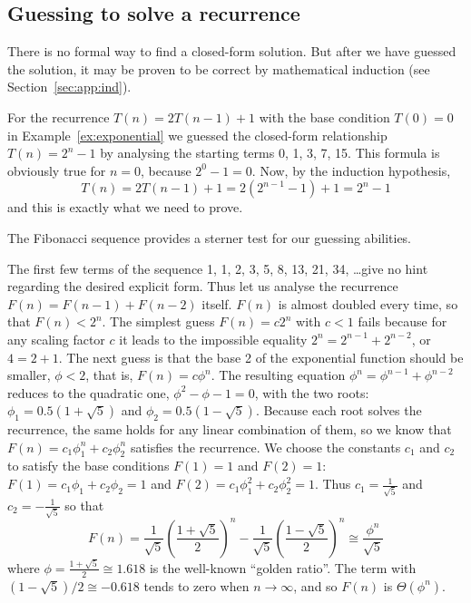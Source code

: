 \subsection{Guessing to solve a recurrence}

There is no formal way to find a closed-form solution. But after we 
have guessed the solution, it may be proven to be correct by 
mathematical induction (see Section~\ref{sec:app:ind}).

\begin{Example}\label{ex:exp:recurrence}
For the recurrence \(T(n) = 2T(n-1)+1\) with
the base condition \(T(0) = 0\) in Example~\ref{ex:exponential}
we guessed
the closed-form relationship \(T(n) = 2^{n} - 1\) by
analysing the starting terms 0, 1, 3, 7, 15. This formula
is obviously true for \(n=0\), because \(2^0 - 1 = 0\).
Now, by the induction hypothesis, 
\[
T(n) = 2T(n-1)+1 = 2  (2^{n-1}-1) + 1 = 2^{n} - 1
\]
and this is exactly what we need to prove.
\end{Example}

The Fibonacci sequence provides a sterner test for our guessing abilities.
\begin{Example}
\label{ex:fibonacci:formula}
The first few terms of the sequence 
1, 1, 2, 3, 5, 8, 13, 21, 34, \ldots give
no hint regarding the desired explicit form. Thus let us
analyse the recurrence 
\(F(n)=F(n-1)+F(n-2)\) itself. \(F(n)\) is almost
doubled every time, so that \(F(n) < 2^n\). The simplest
guess \(F(n) = c2^n\) with \(c < 1\) 
fails because for any scaling factor 
\(c\) it leads to the impossible equality \(2^n = 2^{n-1}+2^{n-2}\),
or \(4 = 2 + 1\). The next guess is
that the base 2 of the
exponential function should be smaller, \(\phi < 2\),
that is, \(F(n) = c\phi^n\). The resulting
equation \(\phi^n = \phi^{n-1} + \phi^{n-2}\) 
reduces to the quadratic one, \(\phi^2 - \phi - 1 = 0\),
with the two roots:
\(\phi_{1} = 0.5 (1+\sqrt{5})\) and 
\(\phi_{2} = 0.5 (1-\sqrt{5})\). Because
each root solves the recurrence,
the same holds for any linear combination of them, so we know that
\(
F(n) = c_1 \phi_{1}^n + c_2 \phi_{2}^n
\)
satisfies the recurrence. We choose the constants 
 \(c_1\) and \(c_2\) to satisfy 
the base conditions \(F(1)=1\) and \(F(2)=1\):
\(F(1) = c_1 \phi_1 + c_2 \phi_2 = 1\)  and  
\(F(2) = c_1 \phi_{1}^2 + c_2 \phi_{2}^2 = 1\).
Thus \(c_1 = \frac{1}{\sqrt{5}}\) and
\(c_2 = -\frac{1}{\sqrt{5}}\) so that 
\[
F(n) = \frac{1}{\sqrt{5}}
\left (
\frac{1+\sqrt{5}}{2}
\right )^n - \frac{1}{\sqrt{5}}
\left (
\frac{1-\sqrt{5}}{2}
\right )^n \cong \frac{\phi^{n}}{\sqrt{5}}
\] 
where
$\phi = \frac{1+\sqrt{5}}{2} \cong 1.618$ is the 
well-known ``golden ratio''. The term
with $(1-\sqrt{5})/2 \cong -0.618$ tends to zero when
\(n \rightarrow \infty\), and so $F(n)$ is $\Theta(\phi^n)$.
\end{Example}


